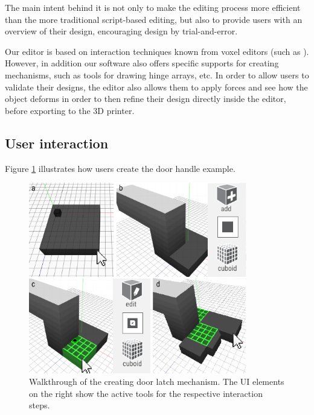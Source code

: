 The main intent behind it is not only to make the editing process more efficient than the more traditional script-based editing, but also to provide users with an overview of their design, encouraging design by trial-and-error. 

Our editor is based on interaction techniques known from voxel editors (such  as \cite{VoxCAD2018}). However, in addition our software also offers specific supports for creating mechanisms, such as tools for drawing hinge arrays, etc. In order to allow users to validate their designs, the editor also allows them to apply forces and see how the object deforms in order to then refine their design directly inside the editor, before exporting to the 3D printer.


\subsection{User interaction}

Figure \ref{fig:21-editor-walkthrough} illustrates how users create the door handle example.

\begin{figure} [h]
    \centering
    \includegraphics[width=0.85\textwidth]{chapters/metamaterial-mechanisms-FIG/21-editor-walkthrough.pdf}
    \caption[Short figure name.]{Walkthrough of the creating door latch mechanism. The UI elements on the right show the active tools for the respective interaction steps.
    \label{fig:21-editor-walkthrough}}
\end{figure}


